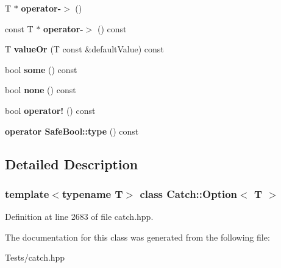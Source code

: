 \begin{DoxyCompactItemize}
T $\ast$ {\bfseries operator-\/$>$} ()
\item 
\mbox{\label{class_catch_1_1_option_ae8343cbc36dbb95b2dce333d2a6fdc28}} 
const T $\ast$ {\bfseries operator-\/$>$} () const
\item 
\mbox{\label{class_catch_1_1_option_a8d9ae2e30b0eb76fe134a6fbc8423124}} 
T {\bfseries value\+Or} (T const \&default\+Value) const
\item 
\mbox{\label{class_catch_1_1_option_a97c95829afbe92f2bcc5fd75b32c0825}} 
bool {\bfseries some} () const
\item 
\mbox{\label{class_catch_1_1_option_a821753afdc3fac947a13a01fbe0d248e}} 
bool {\bfseries none} () const
\item 
\mbox{\label{class_catch_1_1_option_a96dccb86bdf45ee0c08e122b6133bef3}} 
bool {\bfseries operator!} () const
\item 
\mbox{\label{class_catch_1_1_option_a8ed8de7b072f893c85df14913dbbe197}} 
{\bfseries operator Safe\+Bool\+::type} () const
\end{DoxyCompactItemize}


\subsection{Detailed Description}
\subsubsection*{template$<$typename T$>$\newline
class Catch\+::\+Option$<$ T $>$}



Definition at line 2683 of file catch.\+hpp.



The documentation for this class was generated from the following file\+:\begin{DoxyCompactItemize}
\item 
Tests/catch.\+hpp\end{DoxyCompactItemize}
